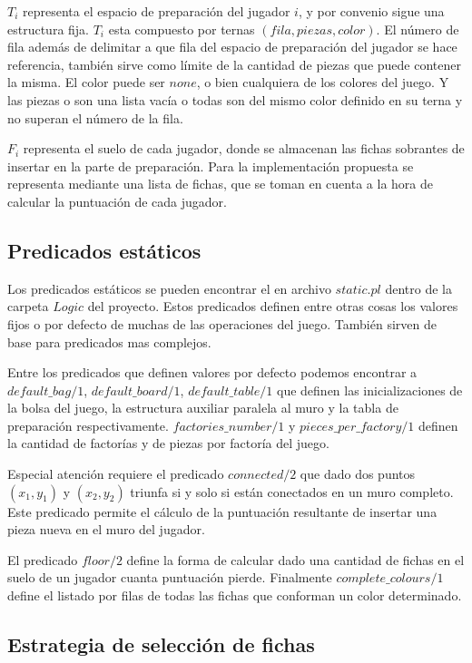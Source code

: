 \documentclass[a4paper,10pt,twocolumn]{article}
\begin{document}
	$T_i$ representa el espacio de preparación del jugador $i$, y por convenio sigue una estructura fija. $T_i$ esta compuesto por ternas $(fila, piezas, color)$. El número de fila además de delimitar a que fila del espacio de preparación del jugador se hace referencia, también sirve como límite de la cantidad de piezas que puede contener la misma. El color puede ser $none$, o bien cualquiera de los colores del juego. Y las piezas o son una lista vacía o todas son del mismo color definido en su terna y no superan el número de la fila.
	
	$F_i$ representa el suelo de cada jugador, donde se almacenan las fichas sobrantes de insertar en la parte de preparación. Para la implementación propuesta se representa mediante una lista de fichas, que se toman en cuenta a la hora de calcular la puntuación de cada jugador. 
	
	\subsection{Predicados estáticos}
	
	Los predicados estáticos se pueden encontrar el en archivo $static.pl$ dentro de la carpeta $Logic$ del proyecto. Estos predicados definen entre otras cosas los valores fijos o por defecto de muchas de las operaciones del juego. También sirven de base para predicados mas complejos.
	
	Entre los predicados que definen valores por defecto podemos encontrar a $default\_bag/1$, $default\_board/1$, $default\_table/1$ que definen las inicializaciones de la bolsa del juego, la estructura auxiliar paralela al muro y la tabla de preparación respectivamente. $factories\_number/1$ y $pieces\_per\_factory/1$ definen la cantidad de factorías y de piezas por factoría del juego.
	
	Especial atención requiere el predicado $connected/2$ que dado dos puntos $(x_1, y_1)$ y $(x_2,y_2)$ triunfa si y solo si están conectados en un muro completo. Este predicado permite el cálculo de la puntuación resultante de insertar una pieza nueva en el muro del jugador.
	
	El predicado $floor/2$ define la forma de calcular dado una cantidad de fichas en el suelo de un jugador cuanta puntuación pierde. Finalmente $complete\_colours/1$ define el listado por filas de todas las fichas que conforman un color determinado.
	
	\subsection{Estrategia de selección de fichas}
	
\end{document}
